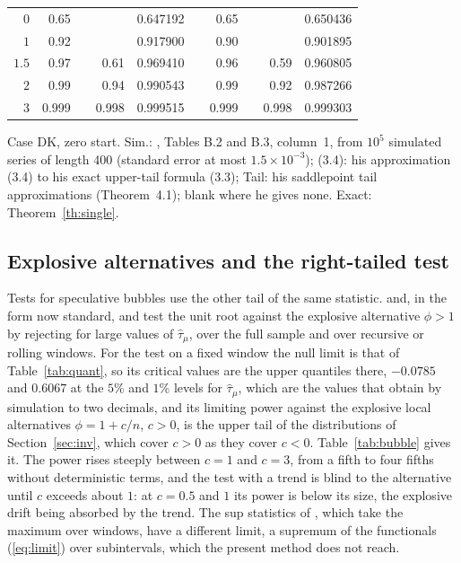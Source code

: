 \documentclass[ecta,nameyear,final]{econsocart}
\newcommand{\Fk}{\textsf{\upshape DK}}
\theoremstyle{plain}
\theoremstyle{definition}
\begin{document}
\begin{table}[tbp]
\begin{center}
\begin{tabular}{rrrrrcrrrr}
$0$    & 0.65  & &       & 0.647192 & & 0.65  & &       & 0.650436\\
$1$    & 0.92  & &       & 0.917900 & & 0.90  & &       & 0.901895\\
$1.5$  & 0.97  & & 0.61  & 0.969410 & & 0.96  & & 0.59  & 0.960805\\
$2$    & 0.99  & & 0.94  & 0.990543 & & 0.99  & & 0.92  & 0.987266\\
$3$    & 0.999 & & 0.998 & 0.999515 & & 0.999 & & 0.998 & 0.999303\\
\bottomrule
\end{tabular}
\end{center}
{\small Case \Fk, zero start.  Sim.: \cite{Larsson1995}, Tables B.2 and B.3, column~1, from $10^5$ simulated series of length 400 (standard error at most $1.5\times10^{-3}$); (3.4): his approximation (3.4) to his exact upper-tail formula (3.3); Tail: his saddlepoint tail approximations (Theorem~4.1); blank where he gives none.  Exact: Theorem~\ref{th:single}.}
\end{table}

\subsection{Explosive alternatives and the right-tailed test}
\label{sec:bubble}

Tests for speculative bubbles use the other tail of the same statistic.  \cite{DibaGrossman1988} and, in the form now standard, \cite{PhillipsWuYu2011} and \cite{PhillipsShiYu2015} test the unit root against the explosive alternative $\phi>1$ by rejecting for large values of $\hat\tau_\mu$, over the full sample and over recursive or rolling windows.  For the test on a fixed window the null limit is that of Table~\ref{tab:quant}, so its critical values are the upper quantiles there, $-0.0785$ and $0.6067$ at the $5\%$ and $1\%$ levels for $\hat\tau_\mu$, which are the values that \cite{PhillipsWuYu2011} obtain by simulation to two decimals, and its limiting power against the explosive local alternatives $\phi=1+c/n$, $c>0$, is the upper tail of the distributions of Section~\ref{sec:inv}, which cover $c>0$ as they cover $c<0$.  Table~\ref{tab:bubble} gives it.  The power rises steeply between $c=1$ and $c=3$, from a fifth to four fifths without deterministic terms, and the test with a trend is blind to the alternative until $c$ exceeds about $1$: at $c=0.5$ and $1$ its power is below its size, the explosive drift being absorbed by the trend.  The sup statistics of \cite{PhillipsWuYu2011}, which take the maximum over windows, have a different limit, a supremum of the functionals (\ref{eq:limit}) over subintervals, which the present method does not reach.
\end{document}
